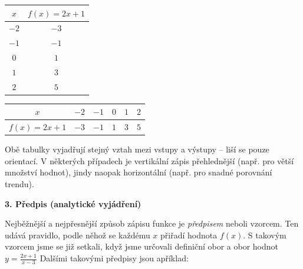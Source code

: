 \documentclass[12pt,a4paper]{article}
\begin{document}
\begin{center}
    \begin{minipage}{0.45\textwidth}
        \centering
        \begin{tabular}{|c|c|}
            \hline
            \rowcolor{tableheaderdark} \(x\) & \(f(x) = 2x + 1\) \\
            \hline
            $-2$ & $-3$ \\
            \hline
            $-1$ & $-1$ \\
            \hline
            $0$ & $1$ \\
            \hline
            $1$ & $3$ \\
            \hline
            $2$ & $5$ \\
            \hline
        \end{tabular}
    \end{minipage}
            \hspace{1cm}
    \begin{minipage}{0.45\textwidth}
        \centering
        \begin{tabular}{|c|c|c|c|c|c|}
            \hline
            \rowcolor{tableheaderdark} \(x\) & $-2$ & $-1$ & $0$ & $1$ & $2$ \\
            \hline
            \(f(x)=2x+1\) & $-3$ & $-1$ & $1$ & $3$ & $5$ \\
            \hline
        \end{tabular}
    \end{minipage}
\end{center}


Obě tabulky vyjadřují stejný vztah mezi vstupy a výstupy – liší se pouze orientací.  
V některých případech je vertikální zápis přehlednější (např. pro větší množství hodnot), jindy naopak horizontální (např. pro snadné porovnání trendu).


\medskip
\textbf{3. Předpis (analytické vyjádření)}

Nejběžnější a nejpřesnější způsob zápisu funkce je \emph{předpisem} neboli vzorcem.  
Ten udává pravidlo, podle něhož se každému \(x\) přiřadí hodnota \(f(x)\). 
S takovým vzorcem jsme se již setkali, když jsme určovali definiční obor a obor hodnot $y=\frac{2x+1}{x-3}$
Dalšími takovými předpisy jsou apříklad:
\end{document}
